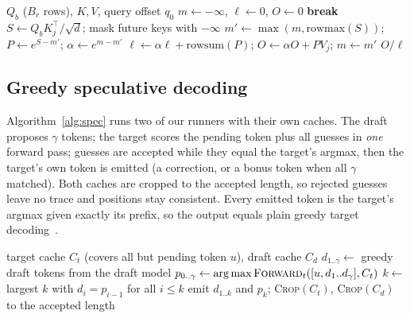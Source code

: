 \documentclass[conference]{IEEEtran}
\begin{document}
\begin{algorithm}[t]
\caption{Tiled causal attention, one query block}\label{alg:tiled}
\small
\begin{algorithmic}[1]
\Require $Q_b$ ($B_r$ rows), $K,V$, query offset $q_0$
\State $m \gets -\infty$, $\ell \gets 0$, $O \gets 0$
   \textbf{break} \EndIf
  \State $S \gets Q_b K_j^\top/\sqrt{d}$; mask future keys with $-\infty$
  \State $m' \gets \max(m, \mathrm{rowmax}(S))$; $P \gets e^{S - m'}$; $\alpha \gets e^{m - m'}$
  \State $\ell \gets \alpha\ell + \mathrm{rowsum}(P)$; \; $O \gets \alpha O + P V_j$; \; $m \gets m'$
\EndFor
\State \Return $O/\ell$ 
\end{algorithmic}
\end{algorithm}

\subsection{Greedy speculative decoding}
Algorithm~\ref{alg:spec} runs two of our runners with their own caches. The draft proposes $\gamma$ tokens; the target scores the pending token plus all guesses in \emph{one} forward pass; guesses are accepted while they equal the target's argmax, then the target's own token is emitted (a correction, or a bonus token when all $\gamma$ matched). Both caches are cropped to the accepted length, so rejected guesses leave no trace and positions stay consistent. Every emitted token is the target's argmax given exactly its prefix, so the output equals plain greedy target decoding~\cite{leviathan2023spec}.

\begin{algorithm}[t]
\caption{Greedy speculative round}\label{alg:spec}
\small
\begin{algorithmic}[1]
\Require target cache $C_t$ (covers all but pending token $u$), draft cache $C_d$
\State $d_{1..\gamma} \gets$ greedy draft tokens from the draft model
\State $p_{0..\gamma} \gets \arg\max \textsc{Forward}_t([u, d_1..d_\gamma], C_t)$ 
\State $k \gets$ largest $k$ with $d_i = p_{i-1}$ for all $i \le k$
\State emit $d_{1..k}$ and $p_k$; \; \textsc{Crop}$(C_t)$, \textsc{Crop}$(C_d)$ to the accepted length
\end{algorithmic}
\end{algorithm}
\end{document}
